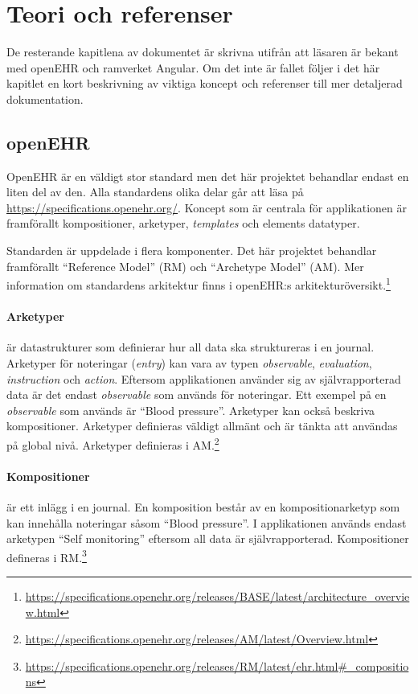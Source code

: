 \documentclass[techdoc/techdoc.tex]{subfiles}
\begin{document}
\section{Teori och referenser}
De resterande kapitlena av dokumentet är skrivna utifrån att läsaren är bekant
med openEHR och ramverket Angular. Om det inte är fallet följer i det här
kapitlet en kort beskrivning av viktiga koncept och referenser till mer
detaljerad dokumentation.

\subsection{openEHR}
OpenEHR är en väldigt stor standard men det här projektet behandlar endast en
liten del av den. Alla standardens olika delar går att läsa på
\url{https://specifications.openehr.org/}.
Koncept som är centrala för applikationen är framförallt kompositioner,
arketyper, \emph{templates} och elements datatyper.

Standarden är uppdelade i flera komponenter. Det här projektet behandlar
framförallt ``Reference Model'' (RM) och ``Archetype Model'' (AM). Mer
information om standardens arkitektur finns i openEHR:s
arkitekturöversikt.\footnote{
    \url{https://specifications.openehr.org/releases/BASE/latest/architecture_overview.html}
}

\paragraph{Arketyper} är datastrukturer som definierar hur all data ska
struktureras i en journal. Arketyper för noteringar (\emph{entry}) kan vara av
typen \emph{observable}, \emph{evaluation}, \emph{instruction} och
\emph{action}. Eftersom applikationen använder sig av självrapporterad data är
det endast \emph{observable} som används för noteringar. Ett exempel på en
\emph{observable} som används är ``Blood pressure''. Arketyper kan också
beskriva kompositioner. Arketyper definieras väldigt allmänt och är tänkta att
användas på global nivå. Arketyper definieras i AM.\footnote{
    \url{https://specifications.openehr.org/releases/AM/latest/Overview.html}
}

\paragraph{Kompositioner} är ett inlägg i en journal. En komposition består av
en kompositionarketyp som kan innehålla noteringar såsom ``Blood pressure''. I
applikationen används endast arketypen ``Self monitoring'' eftersom all data är
självrapporterad. Kompositioner defineras i RM.\footnote{
    \url{https://specifications.openehr.org/releases/RM/latest/ehr.html\#_compositions}
}
\end{document}
